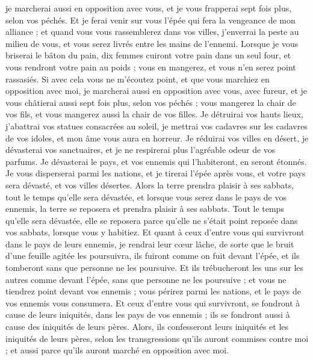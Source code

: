 \begin{multicols}{2}
je marcherai aussi en opposition avec vous, et je vous frapperai sept fois plus, selon vos péchés.
Et je ferai venir sur vous l'épée qui fera la vengeance de mon alliance ; et quand vous vous rassemblerez dans vos villes, j'enverrai la peste au milieu de vous, et vous serez livrés entre les mains de l'ennemi.
Lorsque je vous briserai le bâton du pain, dix femmes cuiront votre pain dans un seul four, et vous rendront votre pain au poids ; vous en mangerez, et vous n'en serez point rassasiés.
Si avec cela vous ne m'écoutez point, et que vous marchiez en opposition avec moi,
je marcherai aussi en opposition avec vous, avec fureur, et je vous châtierai aussi sept fois plus, selon vos péchés ;
vous mangerez la chair de vos fils, et vous mangerez aussi la chair de vos filles.
Je détruirai vos hauts lieux, j'abattrai vos statues consacrées au soleil, je mettrai vos cadavres sur les cadavres de vos idoles, et mon âme vous aura en horreur.
Je réduirai vos villes en désert, je dévasterai vos sanctuaires, et je ne respirerai plus l'agréable odeur de vos parfums.
Je dévasterai le pays, et vos ennemis qui l'habiteront, en seront étonnés.
Je vous disperserai parmi les nations, et je tirerai l'épée après vous, et votre pays sera dévasté, et vos villes désertes.
Alors la terre prendra plaisir à ses sabbats, tout le temps qu'elle sera dévastée, et lorsque vous serez dans le pays de vos ennemis, la terre se reposera et prendra plaisir à ses sabbats.
Tout le temps qu'elle sera dévastée, elle se reposera parce qu'elle ne s'était point reposée dans vos sabbats, lorsque vous y habitiez.
Et quant à ceux d'entre vous qui survivront dans le pays de leurs ennemis, je rendrai leur cœur lâche, de sorte que le bruit d'une feuille agitée les poursuivra, ils fuiront comme on fuit devant l'épée, et ils tomberont sans que personne ne les poursuive.
Et ils trébucheront les uns sur les autres comme devant l'épée, sans que personne ne les poursuive ; et vous ne tiendrez point devant vos ennemis ;
vous périrez parmi les nations, et le pays de vos ennemis vous consumera.
Et ceux d'entre vous qui survivront, se fondront à cause de leurs iniquités, dans les pays de vos ennemis ; ils se fondront aussi à cause des iniquités de leurs pères.
Alors, ils confesseront leurs iniquités et les iniquités de leurs pères, selon les transgressions qu'ils auront commises contre moi ; et aussi parce qu'ils auront marché en opposition avec moi.

\end{multicols}
